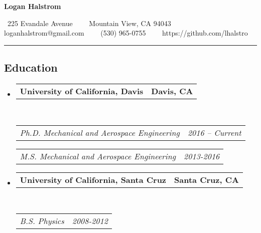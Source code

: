 \documentclass[10pt,letterpaper]{article}
\makeatletter
\newcommand{\CVAuthor}{Logan Halstrom}
\newcommand{\CVWebpage}{https://github.com/lhalstro}
\newcommand{\CVEmail}{loganhalstrom@gmail.com}
\newcommand{\CVPhone}{(530) 965-0755}
\newcommand{\CVAddressStreet}{225 Evandale Avenue}
\newcommand{\CVAddressCity}{Mountain View, CA 94043}
\newcommand{\headerrow}[2]
{\begin{tabular*}{\linewidth}{l@{\extracolsep{\fill}}r}
    #1 &
    #2 \\
\end{tabular*}}
\makeatother
\begin{document}

\begin{center}
    {\LARGE \textbf{\CVAuthor}}

    \ \CVAddressStreet\ \ \textbullet
    \ \ \CVAddressCity
    \\
    \hspace{1.7em} \CVEmail\ \ \textbullet
               \ \ \CVPhone\ \ \textbullet
               \ \ \CVWebpage
\end{center}



\hrule
\vspace{-0.4em}
\subsection*{Education}

\begin{itemize}
    \parskip=0.1em

    \item
          \headerrow
          {\textbf{University of California, Davis}}
          {\textbf{Davis, CA}}
          \\
          \headerrow
          {\emph{Ph.D. Mechanical and Aerospace Engineering}}
          {\emph{2016 -- Current}}

          \headerrow
          {\emph{M.S. Mechanical and Aerospace Engineering}}
          {\emph{2013-2016}}

    \item
          \headerrow
          {\textbf{University of California, Santa Cruz}}
          {\textbf{Santa Cruz, CA}}
          \\
          \headerrow
          {\emph{B.S. Physics}}
          {\emph{2008-2012}}
\end{itemize}
\end{document}
